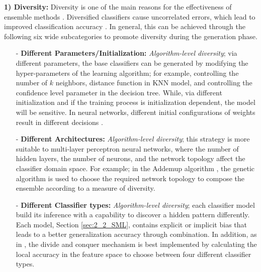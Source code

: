  \textbf{1) Diversity:}
Diversity is one of the main reasons for the effectiveness of ensemble methods \cite{zhou2012,gonzalez2020}. Diversified classifiers cause uncorrelated errors, which lead to improved classification accuracy \cite{hu2001}. In general, this can be achieved through the following six wide subcategories to promote diversity during the generation phase.
\begin{itemize}
    \item[-] \textbf{Different Parameters/Initialization:} \textit{Algorithm-level diversity}; via different parameters, the base classifiers can be generated by modifying the hyper-parameters of the learning algorithm; for example, controlling the number of $k$ neighbors, distance function in KNN model, and controlling the confidence level parameter in the decision tree. While, via different initialization and if the training process is initialization dependent, the model will be sensitive. In neural networks, different initial configurations of weights result in different decisions \cite{hansen1990}.        
  \item[-] \textbf{Different Architectures:}  \textit{Algorithm-level diversity}; this strategy is more suitable to multi-layer perceptron neural networks, where the number of hidden layers, the number of neurons, and the network topology affect the classifier domain space. For example; in the Addemup algorithm \cite{opitz1996}, the genetic algorithm is used to choose the required network topology to compose the ensemble according to a measure of diversity.     
  \item[-]\textbf{Different Classifier types:} \textit{Algorithm-level diversity}; each classifier model build its inference with a capability to discover a hidden pattern differently. Each model, Section \ref{sec:2_2_SML}, contains explicit or implicit bias that leads to a better generalization accuracy through combination. In addition, as in \cite {woods1997}, the divide and conquer mechanism is best implemented by calculating the local accuracy in the feature space to choose between four different classifier types.  

\end{itemize}
